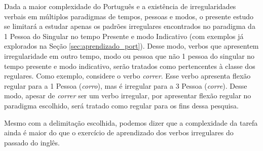 Dada a maior complexidade do Português e a existência de irregularidades verbais em múltiplos paradigmas de tempos, pessoas e modos, o presente estudo se limitará a estudar apenas os padrões irregulares encontrados no paradigma da 1 Pessoa do Singular no tempo Presente e modo Indicativo (com exemplos já explorados na Seção \ref{sec:aprendizado_port}). Desse modo, verbos que apresentem irregularidade em outro tempo, modo ou pessoa que não 1 pessoa do singular no tempo presente e modo indicativo, serão tratados como pertencentes à classe dos regulares. Como exemplo, considere o verbo \textit{correr}. Esse verbo apresenta flexão regular para a 1 Pessoa (\textit{corro}), mas é irregular para a 3 Pessoa (\textit{corre}). Desse modo, apesar de \textit{correr} ser um verbo irregular, por apresentar flexão regular no paradigma escolhido, será tratado como regular para os fins dessa pesquisa.

Mesmo com a delimitação escolhida, podemos dizer que a complexidade da tarefa ainda é maior do que o exercício de aprendizado dos verbos irregulares do passado do inglês. 

 






